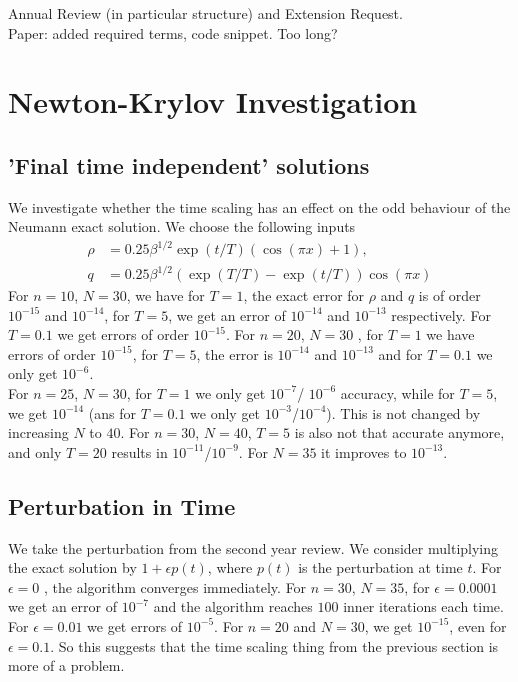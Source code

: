 \documentclass[11pt, a4paper]{article}
\theoremstyle{definition}
\begin{document}
Annual Review (in particular structure) and Extension Request.\\
Paper: added required terms, code snippet. Too long?
\section{Newton-Krylov Investigation}
\subsection{'Final time independent' solutions}
We investigate whether the time scaling has an effect on the odd behaviour of the Neumann exact solution.
We choose the following inputs
\begin{align*}
	\rho &= 0.25\beta^{1/2}\exp(t/T) (\cos(\pi x) + 1), \\
	q &= 0.25\beta^{1/2}(\exp(T/T) - \exp(t/T))\cos(\pi x) 
\end{align*}
For $n = 10$, $N = 30$, we have for $T = 1$, the exact error for $\rho$ and $q$ is of order $10^{-15}$ and $10^{-14}$, for $T = 5$, we get an error of $10^{-14}$ and $10^{-13}$ respectively. For $T= 0.1$ we get errors of order $10^{-15}$.
For $n = 20$, $N = 30$ , for $T = 1$ we have errors of order $10^{-15}$, for $T = 5$, the error is $10^{-14}$ and $10^{-13}$ and for $T = 0.1$ we only get $10^{-6}$.\\
For $n = 25$, $N = 30$, for $T = 1$ we only get $10^{-7}$/ $10^{-6}$ accuracy, while for $T = 5$, we get $10^{-14}$ (ans for $T = 0.1$ we only get $10^{-3}$/$10^{-4}$). This is not changed by increasing $N$ to $40$.
For $n = 30$, $N = 40$, $T = 5$ is also not that accurate anymore, and only $T = 20$ results in $10^{-11}$/$10^{-9}$. For $N = 35$ it improves to $10^{-13}$.

\subsection{Perturbation in Time}
We take the perturbation from the second year review.
We consider multiplying the exact solution by $1+ \epsilon p(t)$, where $p(t)$ is the perturbation at time $t$. For $\epsilon  = 0$ , the algorithm converges immediately. For $n = 30$, $N = 35$, for $\epsilon = 0.0001$ we get an error of $10^{-7}$ and the algorithm reaches $100$ inner iterations each time. For $\epsilon = 0.01$ we get errors of $10^{-5}$.
For $n = 20$ and $N = 30$, we get $10^{-15}$, even for $\epsilon = 0.1$. So this suggests that the time scaling thing from the previous section is more of a problem.
\end{document}
